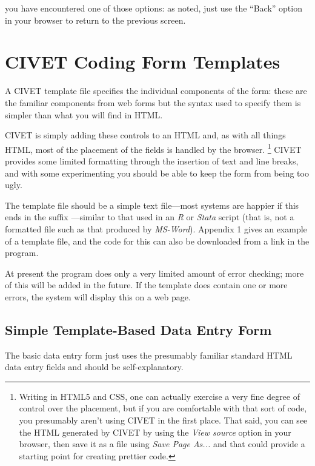 \documentclass[letterpaper,10pt,english]{sphinxmanual}
\begin{document}
you have encountered one of those options: as noted, just use the “Back”
option in your browser to return to the previous screen.


\chapter{CIVET Coding Form Templates}
\label{forms:sec-forms}\label{forms:civet-coding-form-templates}\label{forms::doc}
A CIVET template file specifies the individual components of the form:
these are the familiar components from web forms but the syntax used to
specify them is simpler than what you will find in HTML.

CIVET is simply adding these controls to an HTML  and, as with
all things HTML, most of the placement of the fields is handled by the
browser. \footnote{
Writing in HTML5 and CSS, one can actually exercise a very fine
degree of control over the placement, but if you are comfortable with
that sort of code, you presumably aren’t using CIVET in the first
place. That said, you can see the HTML generated by CIVET by using
the \emph{View source} option in your browser, then save it as a file
using \emph{Save Page As...} and that could provide a starting point for
creating prettier code.
} CIVET provides some limited formatting through the
insertion of text and line breaks, and with some experimenting you
should be able to keep the form from being too ugly.

The template file should be a simple text file—most systems are happier
if this ends in the suffix —similar to that used in an \emph{R}
or \emph{Stata} script (that is, not a formatted file such as that
produced by \emph{MS-Word}). Appendix 1 gives an example of a template
file, and the code for this can also be downloaded from a link in the
program.

At present the program does only a very limited amount of error
checking; more of this will be added in the future. If the template does
contain one or more errors, the system will display this on a web page.


\section{Simple Template-Based Data Entry Form}
\label{forms:simple-template-based-data-entry-form}
The basic data entry form just uses the presumably familiar standard
HTML data entry fields and should be self-explanatory.
\end{document}
